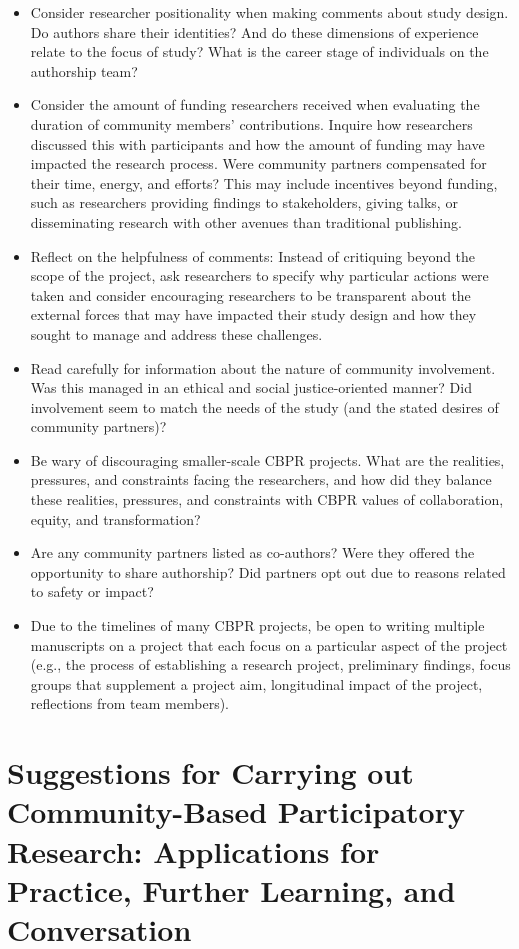 \documentclass[
  11pt,
]{book}
\providecommand{\tightlist}{%
  \setlength{\itemsep}{0pt}\setlength{\parskip}{0pt}}
\begin{document}
\begin{itemize}
\tightlist
\item
  Consider researcher positionality when making comments about study design. Do authors share their identities? And do these dimensions of experience relate to the focus of study? What is the career stage of individuals on the authorship team?
\item
  Consider the amount of funding researchers received when evaluating the duration of community members' contributions. Inquire how researchers discussed this with participants and how the amount of funding may have impacted the research process. Were community partners compensated for their time, energy, and efforts? This may include incentives beyond funding, such as researchers providing findings to stakeholders, giving talks, or disseminating research with other avenues than traditional publishing.
\item
  Reflect on the helpfulness of comments: Instead of critiquing beyond the scope of the project, ask researchers to specify why particular actions were taken and consider encouraging researchers to be transparent about the external forces that may have impacted their study design and how they sought to manage and address these challenges.
\item
  Read carefully for information about the nature of community involvement. Was this managed in an ethical and social justice-oriented manner? Did involvement seem to match the needs of the study (and the stated desires of community partners)?
\item
  Be wary of discouraging smaller-scale CBPR projects. What are the realities, pressures, and constraints facing the researchers, and how did they balance these realities, pressures, and constraints with CBPR values of collaboration, equity, and transformation?
\item
  Are any community partners listed as co-authors? Were they offered the opportunity to share authorship? Did partners opt out due to reasons related to safety or impact?
\item
  Due to the timelines of many CBPR projects, be open to writing multiple manuscripts on a project that each focus on a particular aspect of the project (e.g., the process of establishing a research project, preliminary findings, focus groups that supplement a project aim, longitudinal impact of the project, reflections from team members).
\end{itemize}

\section{Suggestions for Carrying out Community-Based Participatory Research: Applications for Practice, Further Learning, and Conversation}\label{suggestions-for-carrying-out-community-based-participatory-research-applications-for-practice-further-learning-and-conversation}
\end{document}
